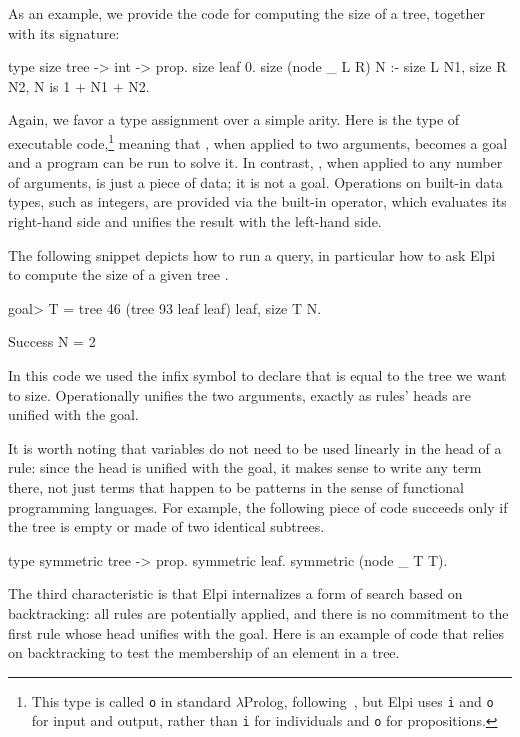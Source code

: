 \documentclass[a4paper, 11pt]{book}
\begin{document}
As an example, we provide the code for
computing the size of a tree, together with its signature:

\begin{elpicode}
type size tree -> int -> prop.
size leaf 0.
size (node _ L R) N :- size L N1, size R N2, N is 1 + N1 + N2.
\end{elpicode}
Again, we favor a type assignment over a simple arity.
Here  is the type
of executable code,\footnote{This type is called \texttt{o} in
standard $\lambda$Prolog, 
following~\cite{Church1940AFO}, but Elpi uses \texttt{i} and \texttt{o}
for input and output, rather than \texttt{i}  for individuals and 
\texttt{o} for propositions.}
 meaning that , when applied to two arguments,
becomes a goal and a program can be run to solve it. In contrast, ,
when applied to any number of arguments, is just a piece of data; it is not a
goal. 
Operations on built-in data types, such as integers, are provided via the
built-in  operator, which evaluates its right-hand side and unifies
the result with the left-hand side.

The following snippet depicts how to run a query, in particular
how to ask Elpi to compute the size  of a given
tree .

\begin{elpicode}
goal> T = tree 46 (tree 93 leaf leaf) leaf, size T N.

Success
  N = 2
\end{elpicode}
In this code we used the infix \elpi{=} symbol to declare that
 is equal to the tree we want to size. Operationally
\elpi{=} unifies the two arguments, exactly as rules' heads are
unified with the goal.

It is worth noting that variables do not need to be used linearly in the head
of a rule: since the head is unified with the goal, it makes sense to write
any term there, not just terms that happen to be patterns in the sense of
functional programming languages. For example, the following piece of code
succeeds only if the tree is empty or made of two identical subtrees.

\begin{elpicode}
type symmetric tree -> prop.
symmetric leaf.
symmetric (node _ T T).
\end{elpicode}
The third characteristic is that Elpi internalizes a form of search based on
backtracking: all rules are potentially applied, and there is no commitment to
the first rule whose head unifies with the goal. Here is an example of code
that relies on backtracking to test the membership of an element in a tree.
\end{document}
